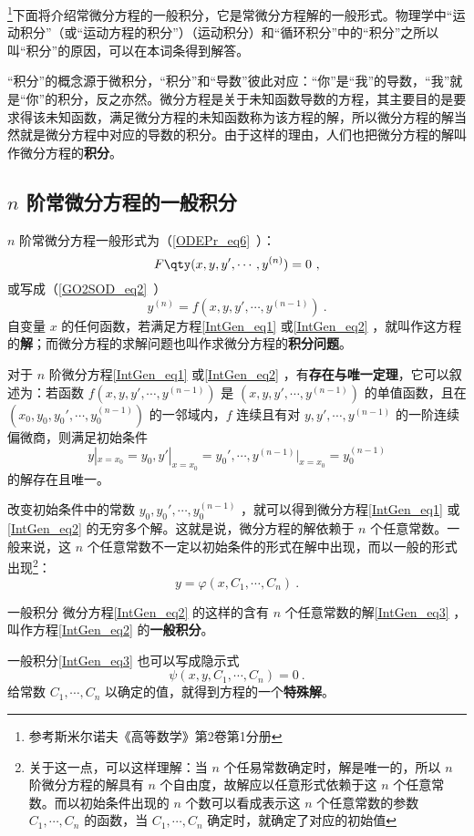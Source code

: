 \footnote{参考斯米尔诺夫《高等数学》第2卷第1分册}下面将介绍常微分方程的一般积分，它是常微分方程解的一般形式。物理学中“运动积分”（或“运动方程的积分”）（运动积分）和“循环积分”中的“积分”之所以叫“积分”的原因，可以在本词条得到解答。

“积分”的概念源于微积分，“积分”和“导数”彼此对应：“你”是“我”的导数，“我”就是“你”的积分，反之亦然。微分方程是关于未知函数导数的方程，其主要目的是要求得该未知函数，满足微分方程的未知函数称为该方程的解，所以微分方程的解当然就是微分方程中对应的导数的积分。由于这样的理由，人们也把微分方程的解叫作微分方程的\textbf{积分}。
\subsection{$n$ 阶常微分方程的一般积分}
$n$ 阶常微分方程一般形式为（\autoref{ODEPr_eq6}~）：
\begin{equation}\label{IntGen_eq1}
F \qty(x,y,y',\cdots,y^{(n)}) =0~,
\end{equation}
或写成（\autoref{GO2SOD_eq2}~）
\begin{equation}\label{IntGen_eq2}
y^{(n)}=f(x,y,y',\cdots,y^{(n-1)})~.
\end{equation}
自变量 $x$ 的任何函数，若满足方程\autoref{IntGen_eq1} 或\autoref{IntGen_eq2} ，就叫作这方程的\textbf{解}；而微分方程的求解问题也叫作求微分方程的\textbf{积分问题}。

对于 $n$ 阶微分方程\autoref{IntGen_eq1} 或\autoref{IntGen_eq2} ，有\textbf{存在与唯一定理}，它可以叙述为：若函数 $f(x,y,y',\cdots,y^{(n-1)})$ 是 $(x,y,y',\cdots,y^{(n-1)})$ 的单值函数，且在 $(x_0,y_0,y_0',\cdots,y_0^{(n-1)})$ 的一邻域内，$f$ 连续且有对 $y,y',\cdots,y^{(n-1)}$ 的一阶连续偏微商，则满足初始条件
\begin{equation}\label{IntGen_eq5}
y|_{x=x_0}=y_0,y'|_{x=x_0}=y_0',\cdots,y^{(n-1)}|_{x=x_0}=y_0^{(n-1)}
\end{equation}
的解存在且唯一。

改变初始条件中的常数 $y_0,y_0',\cdots,y_0^{(n-1)}$ ，就可以得到微分方程\autoref{IntGen_eq1} 或\autoref{IntGen_eq2} 的无穷多个解。这就是说，微分方程的解依赖于 $n$ 个任意常数。一般来说，这 $n$ 个任意常数不一定以初始条件的形式在解中出现，而以一般的形式出现\footnote{关于这一点，可以这样理解：当 $n$ 个任易常数确定时，解是唯一的，所以 $n$ 阶微分方程的解具有 $n$ 个自由度，故解应以任意形式依赖于这 $n$ 个任意常数。而以初始条件出现的 $n$ 个数可以看成表示这 $n$ 个任意常数的参数 $C_1,\cdots,C_n$ 的函数，当 $C_1,\cdots,C_n$ 确定时，就确定了对应的初始值}：
\begin{equation}\label{IntGen_eq3}
y=\varphi(x,C_1,\cdots,C_n)~.
\end{equation}
\begin{definition}{一般积分}
微分方程\autoref{IntGen_eq2} 的这样的含有 $n$ 个任意常数的解\autoref{IntGen_eq3} ，叫作方程\autoref{IntGen_eq2} 的\textbf{一般积分}。
\end{definition}
一般积分\autoref{IntGen_eq3} 也可以写成隐示式
\begin{equation}\label{IntGen_eq4}
\psi(x,y,C_1,\cdots,C_n)=0~.
\end{equation}
给常数 $C_1,\cdots,C_n$ 以确定的值，就得到方程的一个\textbf{特殊解}。

